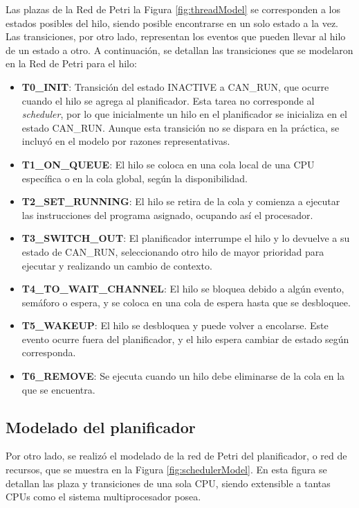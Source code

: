 Las plazas de la Red de Petri la Figura \ref{fig:threadModel} se corresponden a los estados posibles del hilo, siendo posible encontrarse en un solo estado a la vez. Las transiciones, por otro lado, representan los eventos que pueden llevar al hilo de un estado a otro. A continuación, se detallan las transiciones que se modelaron en la Red de Petri para el hilo:

\begin{itemize}
    \item \textbf{T0\_INIT}: Transición del estado INACTIVE a CAN\_RUN, que ocurre cuando el hilo se agrega al planificador. Esta tarea no corresponde al \textit{scheduler}, por lo que inicialmente un hilo en el planificador se inicializa en el estado CAN\_RUN. Aunque esta transición no se dispara en la práctica, se incluyó en el modelo por razones representativas.
    \item \textbf{T1\_ON\_QUEUE}: El hilo se coloca en una cola local de una CPU específica o en la cola global, según la disponibilidad.
    \item \textbf{T2\_SET\_RUNNING}: El hilo se retira de la cola y comienza a ejecutar las instrucciones del programa asignado, ocupando así el procesador.
    \item \textbf{T3\_SWITCH\_OUT}: El planificador interrumpe el hilo y lo devuelve a su estado de CAN\_RUN, seleccionando otro hilo de mayor prioridad para ejecutar y realizando un cambio de contexto.
    \item \textbf{T4\_TO\_WAIT\_CHANNEL}: El hilo se bloquea debido a algún evento, semáforo o espera, y se coloca en una cola de espera hasta que se desbloquee.
    \item \textbf{T5\_WAKEUP}: El hilo se desbloquea y puede volver a encolarse. Este evento ocurre fuera del planificador, y el hilo espera cambiar de estado según corresponda.
    \item \textbf{T6\_REMOVE}: Se ejecuta cuando un hilo debe eliminarse de la cola en la que se encuentra.
\end{itemize}


\subsection{Modelado del planificador}

Por otro lado, se realizó el modelado de la red de Petri del planificador, o red de recursos, que se muestra en la Figura \ref{fig:schedulerModel}. En esta figura se detallan las plaza y transiciones de una sola CPU, siendo extensible a tantas CPUs como el sistema multiprocesador posea.

